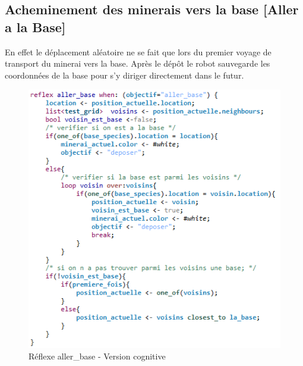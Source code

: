 \subsection{Acheminement des minerais vers la base [Aller a la Base]}

 En effet le déplacement aléatoire ne se fait que lors du premier voyage de transport du minerai vers la base. Après le dépôt le robot sauvegarde les coordonnées de la base pour s'y diriger directement dans le futur. 
 
\begin{figure}[!h]
	\begin{center}
		\includegraphics[width=500pt]{code/aller_base_cognitif}
	\end{center}
	\caption{Réflexe aller\_base - Version cognitive}
\end{figure}


